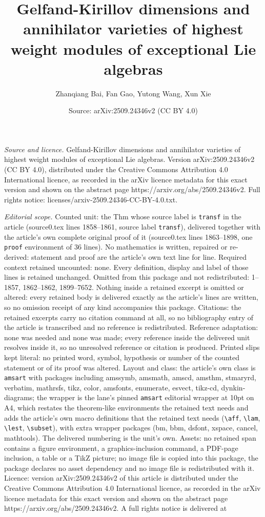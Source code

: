 \documentclass[10pt,a4paper]{amsart}
\title[Gelfand-Kirillov dimensions and annihilator varieties of hig]{Gelfand-Kirillov dimensions and annihilator varieties of highest weight modules of exceptional Lie algebras}
\author{Zhanqiang Bai, Fan Gao, Yutong Wang, Xun Xie}
\date{Source: arXiv:2509.24346v2 (CC BY 4.0)}
\begin{document}
\maketitle

\noindent\emph{Source and licence.} Gelfand-Kirillov dimensions and annihilator varieties of highest weight modules of exceptional Lie algebras. Version arXiv:2509.24346v2 (CC BY 4.0), distributed under the Creative Commons Attribution 4.0 International licence, as recorded in the arXiv licence metadata for this exact version and shown on the abstract page https://arxiv.org/abs/2509.24346v2. Full rights notice: licenses/arxiv-2509.24346-CC-BY-4.0.txt.\par\smallskip

\noindent\textit{Editorial scope.} Counted unit: the Thm whose source label is \texttt{transf} in the article (source0.tex lines 1858--1861, source label \texttt{transf}), delivered together with the article's own complete original proof of it (source0.tex lines 1863--1898, one \texttt{proof} environment of 36 lines). No mathematics is written, repaired or re-derived: statement and proof are the article's own text line for line. Required context retained uncounted: none. Every definition, display and label of those lines is retained unchanged. Omitted from this package and not redistributed: 1--1857, 1862--1862, 1899--7652. Nothing inside a retained excerpt is omitted or altered: every retained body is delivered exactly as the article's lines are written, so no omission receipt of any kind accompanies this package. Citations: the retained excerpts carry no citation command at all, so no bibliography entry of the article is transcribed and no reference is redistributed. Reference adaptation: none was needed and none was made; every reference inside the delivered unit resolves inside it, so no unresolved reference or citation is produced. Printed slips kept literal: no printed word, symbol, hypothesis or number of the counted statement or of its proof was altered. Layout and class: the article's own class is \texttt{amsart} with packages including amssymb, amsmath, amscd, amsthm, stmaryrd, verbatim, mathrsfs, tikz, color, amsfonts, enumerate, esvect, tikz-cd, dynkin-diagrams; the wrapper is the lane's pinned \texttt{amsart} editorial wrapper at 10pt on A4, which restates the theorem-like environments the retained text needs and adds the article's own macro definitions that the retained text needs (\texttt{\textbackslash aff}, \texttt{\textbackslash lam}, \texttt{\textbackslash lest}, \texttt{\textbackslash subset}), with extra wrapper packages (bm, bbm, dsfont, xspace, cancel, mathtools). The delivered numbering is the unit's own. Assets: no retained span contains a figure environment, a graphics-inclusion command, a PDF-page inclusion, a table or a TikZ picture; no image file is copied into this package, the package declares no asset dependency and no image file is redistributed with it. Licence: version arXiv:2509.24346v2 of this article is distributed under the Creative Commons Attribution 4.0 International licence, as recorded in the arXiv licence metadata for this exact version and shown on the abstract page https://arxiv.org/abs/2509.24346v2. A full rights notice is delivered at 
\end{document}
